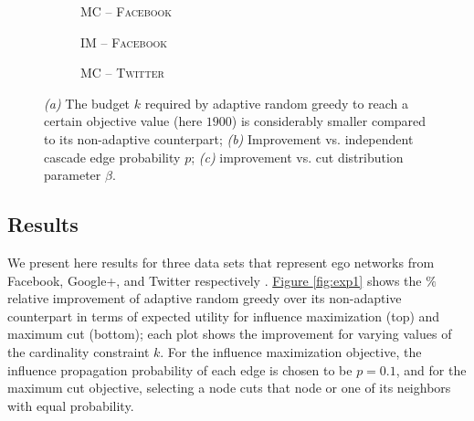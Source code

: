 \documentclass{article}
\newlength\figureheight
\newlength\figurewidth
\newcommand{\figref}[1]{\hyperref[#1]{Figure \ref*{#1}}}
\newcommand{\fbook}{\textsc{Facebook}\xspace}
\newcommand{\twitter}{\textsc{Twitter}\xspace}
\newcommand{\infmax}{IM\xspace}
\newcommand{\maxcut}{MC\xspace}
\begin{document}
\begin{figure}
    \centering
    \begin{minipage}[b][0.5\textwidth]{0.49\textwidth}
      \setlength{}
      \setlength{}
      \begin{subfigure}[b]{\textwidth}
        \centering
        
        \vspace{\scspacey}
        \caption{\maxcut{} -- \fbook}
        \label{fig:fs_ego_fb}
      \end{subfigure}
    \end{minipage}
    \hfill
    \begin{minipage}[b][0.5\textwidth]{0.45\textwidth}
      \setlength{}
      \setlength{}
      \begin{subfigure}[b]{\textwidth}
        \centering
        
        \caption{\hspace{\scspacex}\infmax{} -- \fbook}
        \label{fig:pinf_ego_fb}
      \end{subfigure}
      \begin{subfigure}[b]{\textwidth}
        \centering
        
        \caption{\hspace{\scspacex}\maxcut{} -- \twitter}
        \label{fig:pmc_twitter}
      \end{subfigure}
    \end{minipage}
    \caption{
      \emph{(a)} The budget $k$ required by adaptive random greedy to reach a certain objective value (here $1900$) is considerably smaller compared to its non-adaptive counterpart; \emph{(b)} Improvement vs. independent cascade edge probability $p$; \emph{(c)} improvement vs. cut distribution parameter $\beta$.
    }
    \label{fig:exp2}
\end{figure}

\subsection{Results}
We present here results for three data sets that represent ego networks from Facebook, Google+, and Twitter respectively \cite{mcauley12}.
\figref{fig:exp1} shows the $\%$ relative improvement of adaptive random greedy over its non-adaptive counterpart in terms of expected utility for influence maximization (top) and maximum cut (bottom); each plot shows the improvement for varying values of the cardinality constraint $k$.
For the influence maximization objective, the influence propagation probability of each edge is chosen to be $p=0.1$, and for the maximum cut objective, selecting a node cuts that node or one of its neighbors with equal probability.
\end{document}
